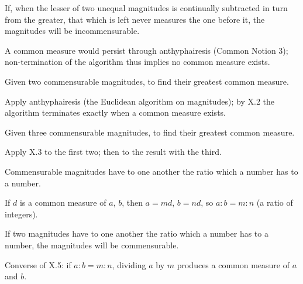 \documentclass{rrxiv}
\begin{document}
\begin{claim}
\label{prop:X.2}
If, when the lesser of two unequal magnitudes is continually
subtracted in turn from the greater, that which is left never
measures the one before it, the magnitudes will be incommensurable.
\end{claim}
\begin{evidence}[Proof of X.2]
\label{ev:X.2}
A common measure would persist through anthyphairesis (Common Notion
3); non-termination of the algorithm thus implies no common measure
exists.
\end{evidence}

\begin{claim}
\label{prop:X.3}
Given two commensurable magnitudes, to find their greatest common
measure.
\end{claim}
\begin{evidence}[Proof of X.3]
\label{ev:X.3}
Apply anthyphairesis (the Euclidean algorithm on magnitudes); by X.2
the algorithm terminates exactly when a common measure exists.
\end{evidence}

\begin{claim}
\label{prop:X.4}
Given three commensurable magnitudes, to find their greatest common
measure.
\end{claim}
\begin{evidence}[Proof of X.4]
\label{ev:X.4}
Apply X.3 to the first two; then to the result with the third.
\end{evidence}

\begin{claim}
\label{prop:X.5}
Commensurable magnitudes have to one another the ratio which a number
has to a number.
\end{claim}
\begin{evidence}[Proof of X.5]
\label{ev:X.5}
If $d$ is a common measure of $a$, $b$, then $a = md$, $b = nd$, so
$a : b = m : n$ (a ratio of integers).
\end{evidence}

\begin{claim}
\label{prop:X.6}
If two magnitudes have to one another the ratio which a number has
to a number, the magnitudes will be commensurable.
\end{claim}
\begin{evidence}[Proof of X.6]
\label{ev:X.6}
Converse of X.5: if $a : b = m : n$, dividing $a$ by $m$ produces a
common measure of $a$ and $b$.
\end{evidence}
\end{document}
